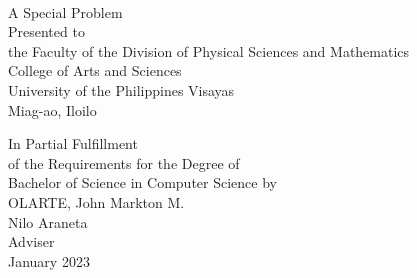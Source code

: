 \begin{titlepage}
\centering

 \\

\vspace{1.5cm}
A Special Problem\\
Presented to\\
the Faculty of the Division of Physical Sciences and Mathematics\\
College of Arts and Sciences\\
University of the Philippines Visayas\\
Miag-ao, Iloilo

\vspace{1.5cm}
In Partial Fulfillment\\
of the Requirements for the Degree of\\
Bachelor of Science in Computer Science
\vspace{1.5cm}
by\\

\vspace{0.5cm}
OLARTE, John Markton M.  \\

\vspace{1.5cm}
Nilo Araneta \\
Adviser\\

\vspace{1.5cm}
January 2023
\end{titlepage}
    